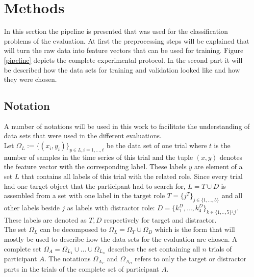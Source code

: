 \section{Methods}
In this section the pipeline is presented that was used for the classification problems of the evaluation. At first the preprocessing steps will be explained that will turn the raw data into feature vectors that can be used for training. Figure \ref{pipeline} depicts the complete experimental protocol. In the second part it will be described how the data sets for training and validation looked like and how they were chosen.

\subsection{Notation}
A number of notations will be used in this work to facilitate the understanding of data sets that were used in the different evaluations. \\
Let $ \Omega_{L} := \{(x_{i},y_{i})\}_{y\in L,i=1,...,t} $ be the data set of one trial where $ t $ is the number of samples in the time series of this trial and the tuple $ (x,y) $ denotes the feature vector with the corresponding label. These labels $ y $  are element of a set $ L $ that contains all labels of this trial with the related role. Since every trial had one target object that the participant had to search for, $ L=T\cup D $ is assembled from a set with one label in the target role $ T=\{j^{T}\}_{j\in\{1,...,5\}} $ and all other labels beside $ j $ as labels with distractor role: $ D=\{k_{1}^{D},...,k_{4}^{D}\}_{k\in\{1,..,5\}\setminus j} $. These labels are denoted as $ T,D $ respectively for target and  distractor. \\
The set $ \Omega_{L} $ can be decomposed to $ \Omega_{L} = \Omega_{T} \cup \Omega_{D} $ which is the form that will mostly be used to describe how the data sets for the evaluation are chosen. A complete set $ \Omega_{A} = \Omega_{L_{1}} \cup \hdots \cup \Omega_{L_{n}} $ describes the set containing all $ n $ trials of participant $ A $. The notations $\Omega_{A_{T}}$ and $ \Omega_{A_{D}} $ refers to only the target or distractor parts in the trials of the complete set of participant $ A $.

